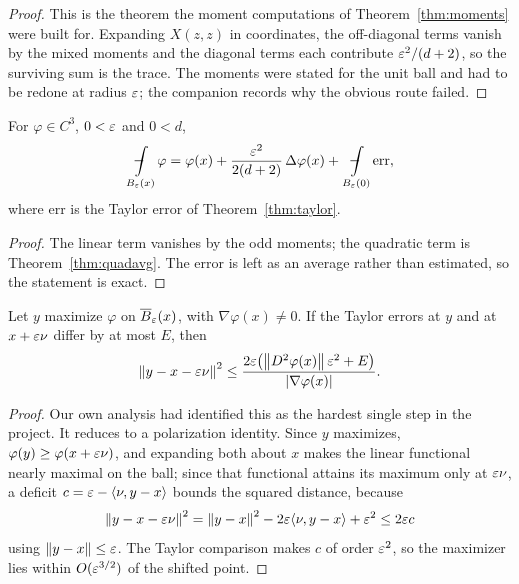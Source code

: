 \begin{proof}
\leanok
{}
This is the theorem the moment computations of Theorem~\ref{thm:moments} were
built for. Expanding $X(z,z)$ in coordinates, the off-diagonal terms vanish by
the mixed moments and the diagonal terms each contribute $\varepsilon^2/(d+2)$, so
the surviving sum is the trace. The moments were stated for the unit ball and
had to be redone at radius $\varepsilon$; the companion records why the
obvious route failed.
\end{proof}


\begin{theorem}\label{thm:avgexp}
\leanok
For $\varphi \in C^3$, $0 < \varepsilon$ and $0 < d$,
\[
  \avgint_{B_\eps(x)} \varphi
    = \varphi(x) + \frac{\eps^2}{2(d+2)}\,\dlap\varphi(x)
      + \avgint_{B_\eps(0)} \mathrm{err} ,
\]
where $\mathrm{err}$ is the Taylor error of Theorem~\ref{thm:taylor}.
\end{theorem}

\begin{proof}
\leanok
{}
The linear term vanishes by the odd moments; the quadratic term is
Theorem~\ref{thm:quadavg}. The error is left as an average rather than
estimated, so the statement is exact.
\end{proof}


\begin{theorem}\label{thm:localize}
\leanok
Let $y$ maximize $\varphi$ on $\overline{B}_\varepsilon(x)$, with
$\nabla\varphi(x) \ne 0$. If the Taylor errors at $y$ and at $x+\varepsilon\nu$ differ
by at most $E$, then
\[
  \left\lVert y - x - \varepsilon\nu\right\rVert^2
  \le \frac{2\varepsilon\bigl(\left\lVert D^2\varphi(x)\right\rVert\varepsilon^2 + E\bigr)}
           {\left\lvert \nabla\varphi(x)\right\rvert} .
\]
\end{theorem}

\begin{proof}
\leanok
{}
Our own analysis had identified this as the hardest single step in the
project. It reduces to a polarization identity. Since $y$ maximizes,
$\varphi(y) \ge \varphi(x+\varepsilon\nu)$, and expanding both about $x$ makes the
linear functional nearly maximal on the ball; since that functional attains
its maximum only at $\varepsilon\nu$, a deficit $c = \varepsilon - \langle\nu, y-x\rangle$
bounds the squared distance, because
\[
  \left\lVert y - x - \varepsilon\nu\right\rVert^2
  = \left\lVert y-x\right\rVert^2 - 2\varepsilon\langle\nu, y-x\rangle + \varepsilon^2
  \le 2\varepsilon c
\]
using $\left\lVert y-x\right\rVert \le \varepsilon$. The Taylor comparison makes $c$ of order
$\varepsilon^2$, so the maximizer lies within $O(\varepsilon^{3/2})$ of the shifted point.
\end{proof}


